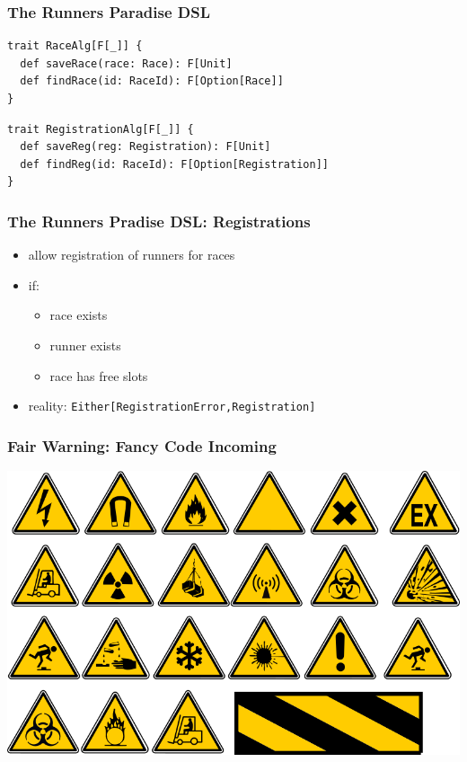 \documentclass{beamer}
\begin{document}
\begin{frame}[fragile]
  \frametitle{The Runners Paradise DSL}
\begin{verbatim}
trait RaceAlg[F[_]] {
  def saveRace(race: Race): F[Unit]
  def findRace(id: RaceId): F[Option[Race]]
}
\end{verbatim}
\begin{verbatim}
trait RegistrationAlg[F[_]] {
  def saveReg(reg: Registration): F[Unit]
  def findReg(id: RaceId): F[Option[Registration]]
}
\end{verbatim}
\end{frame}

\begin{frame}
  \frametitle{The Runners Pradise DSL: Registrations}
  \begin{itemize}
  \item allow registration of runners for races
  \item if:
    \begin{itemize}
    \item race exists
    \item runner exists
    \item race has free slots
    \end{itemize}
  \item reality: \texttt{Either[RegistrationError,Registration]}
  \end{itemize}
\end{frame}

\begin{frame}
  \frametitle{Fair Warning: Fancy Code Incoming}
  \includegraphics[width=\textwidth]{pics/warning.png}
\end{frame}
\end{document}
